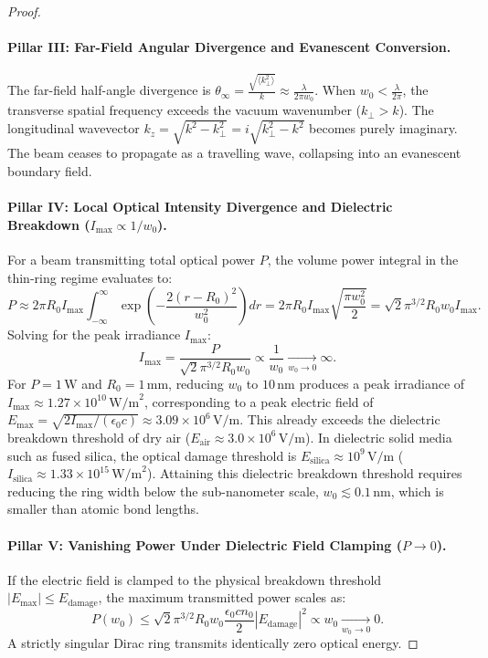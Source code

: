 \documentclass{optica-article}
\begin{document}
\begin{proof}
\paragraph{Pillar III: Far-Field Angular Divergence and Evanescent Conversion.}
The far-field half-angle divergence is $\theta_\infty = \frac{\sqrt{\langle k_\perp^2 \rangle}}{k} \approx \frac{\lambda}{2\pi w_0}$. When $w_0 < \frac{\lambda}{2\pi}$, the transverse spatial frequency exceeds the vacuum wavenumber ($k_\perp > k$). The longitudinal wavevector $k_z = \sqrt{k^2 - k_\perp^2} = i \sqrt{k_\perp^2 - k^2}$ becomes purely imaginary. The beam ceases to propagate as a travelling wave, collapsing into an evanescent boundary field.

\paragraph{Pillar IV: Local Optical Intensity Divergence and Dielectric Breakdown ($I_{\max} \propto 1/w_0$).}
For a beam transmitting total optical power $P$, the volume power integral in the thin-ring regime evaluates to:
\begin{equation}
P \approx 2\pi R_0 I_{\max} \int_{-\infty}^\infty \exp\left( - \frac{2(r - R_0)^2}{w_0^2} \right) dr = 2\pi R_0 I_{\max} \sqrt{\frac{\pi w_0^2}{2}} = \sqrt{2}\pi^{3/2} R_0 w_0 I_{\max}.
\label{eq:power_volume_integral}
\end{equation}
Solving for the peak irradiance $I_{\max}$:
\begin{equation}
\boxed{I_{\max} = \frac{P}{\sqrt{2}\pi^{3/2} R_0 w_0} \propto \frac{1}{w_0} \xrightarrow[w_0 \to 0]{} \infty.}
\label{eq:pillar4_result}
\end{equation}
For $P = 1\,\text{W}$ and $R_0 = 1\,\text{mm}$, reducing $w_0$ to $10\,\text{nm}$ produces a peak irradiance of $I_{\max} \approx 1.27 \times 10^{10}\,\text{W/m}^2$, corresponding to a peak electric field of $E_{\max} = \sqrt{2 I_{\max} / (\epsilon_0 c)} \approx 3.09 \times 10^6\,\text{V/m}$. This already exceeds the dielectric breakdown threshold of dry air ($E_{\text{air}} \approx 3.0 \times 10^6\,\text{V/m}$). In dielectric solid media such as fused silica, the optical damage threshold is $E_{\text{silica}} \approx 10^9\,\text{V/m}$ ($I_{\text{silica}} \approx 1.33 \times 10^{15}\,\text{W/m}^2$). Attaining this dielectric breakdown threshold requires reducing the ring width below the sub-nanometer scale, $w_0 \lesssim 0.1\,\text{nm}$, which is smaller than atomic bond lengths.

\paragraph{Pillar V: Vanishing Power Under Dielectric Field Clamping ($P \to 0$).}
If the electric field is clamped to the physical breakdown threshold $|E_{\max}| \le E_{\text{damage}}$, the maximum transmitted power scales as:
\begin{equation}
\boxed{P(w_0) \le \sqrt{2}\pi^{3/2} R_0 w_0 \frac{\epsilon_0 c n_0}{2} |E_{\text{damage}}|^2 \propto w_0 \xrightarrow[w_0 \to 0]{} 0.}
\label{eq:pillar5_result}
\end{equation}
A strictly singular Dirac ring transmits identically zero optical energy.


\end{proof}
\end{document}
